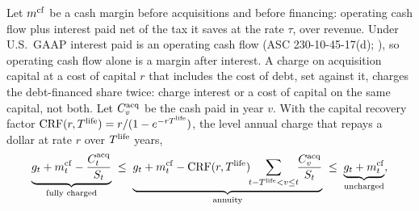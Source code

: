 \begin{remark}\label{rem:acquired-bounds}
Let $m^{\rm cf}$ be a cash margin before acquisitions and before financing: operating cash flow plus interest paid net of the tax it saves at the rate $\tau$, over revenue. Under U.S.\ GAAP interest paid is an operating cash flow (ASC 230-10-45-17(d); \citealp{deloitte2026cashflow}), so operating cash flow alone is a margin after interest. A charge on acquisition capital at a cost of capital $r$ that includes the cost of debt, set against it, charges the debt-financed share twice: charge interest or a cost of capital on the same capital, not both. Let $C^{\rm acq}_v$ be the cash paid in year $v$. With the capital recovery factor $\mathrm{CRF}(r,T^{\rm life})=r/(1-e^{-rT^{\rm life}})$, the level annual charge that repays a dollar at rate $r$ over $T^{\rm life}$ years,
\begin{equation}\label{eq:acquired-bounds}
\underbrace{g_t+m^{\rm cf}_t-\frac{C^{\rm acq}_t}{S_t}}_{\text{fully charged}}
\;\le\;
\underbrace{g_t+m^{\rm cf}_t-\mathrm{CRF}(r,T^{\rm life})\!\!\sum_{t-T^{\rm life}<v\le t}\!\!\frac{C^{\rm acq}_v}{S_t}}_{\text{annuity}}
\;\le\;
\underbrace{g_t+m^{\rm cf}_t}_{\text{uncharged}},
\end{equation}

\end{remark}
